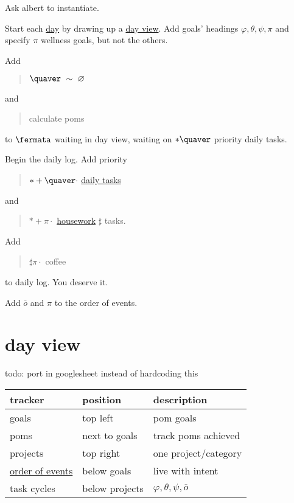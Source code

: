 \documentclass[]{book}
\begin{document}
Ask albert to instantiate.

Start each \href{https://study.com/academy/lesson/german-days-of-the-week.html}{day} by drawing up a \protect\hyperlink{day-view}{day view}. Add goals' headings \(\varphi, \theta, \psi, \pi\) and specify \(\pi\) wellness goals, but not the others.

Add

\begin{quote}
\(\quaver \ \sim \ \varnothing\)
\end{quote}

and

\begin{quote}
calculate poms
\end{quote}

to \(\fermata\) waiting in day view, waiting on \(*\quaver\) priority daily tasks.

Begin the daily log. Add priority

\begin{quote}
\(*+\quaver\cdot\) \protect\hyperlink{daily-tasks}{daily tasks}
\end{quote}

and

\begin{quote}
\(*+\pi\cdot\) \protect\hyperlink{housework}{housework} \(\sharp\) tasks.
\end{quote}

Add

\begin{quote}
\(\sharp \pi \cdot\) coffee
\end{quote}

to daily log. You deserve it.

Add \protect\hyperlink{review}{\(\overline o\)} and \(\pi\) to the order of events.

\hypertarget{day-view}{%
\section{day view}\label{day-view}}

todo: port in googlesheet instead of hardcoding this

\begin{longtable}[]{@{}lll@{}}
\toprule
tracker & position & description\tabularnewline
\midrule
\endhead
goals & top left & pom goals\tabularnewline
poms & next to goals & track poms achieved\tabularnewline
projects & top right & one project/category\tabularnewline
\protect\hyperlink{order-of-events}{order of events} & below goals & live with intent\tabularnewline
task cycles & below projects & \(\varphi, \theta, \psi, \overline o\)\tabularnewline
\bottomrule
\end{longtable}
\end{document}
